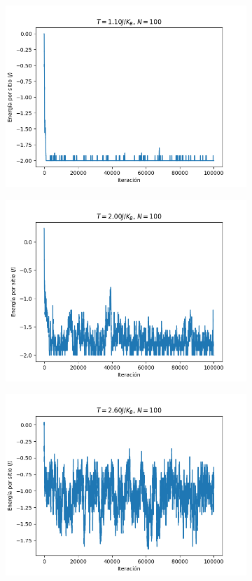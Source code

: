 \documentclass{article}
\begin{document}
\begin{figure}
\centering
\begin{subfigure}{0.7\textwidth}
\includegraphics[width=\textwidth]{energia_200.png}
\end{subfigure}
\begin{subfigure}{0.7\textwidth}
\includegraphics[width=\textwidth]{energia_500.png}
\end{subfigure}
\begin{subfigure}{0.7\textwidth}
\includegraphics[width=\textwidth]{energia_700.png}

\end{subfigure}
\end{figure}
\end{document}
